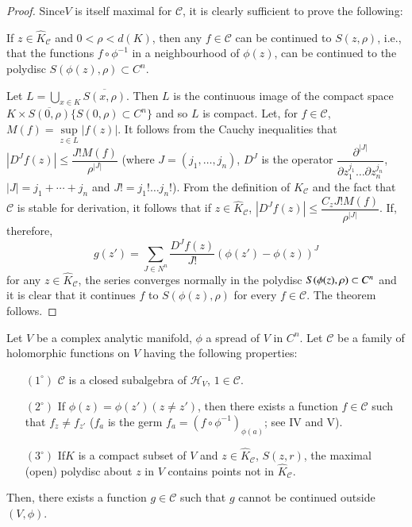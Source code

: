 \begin{proof}
Since\pageoriginale $V$ is itself maximal for $\mathscr{C}$, it is
clearly sufficient to prove the following:

If $z \in \hat{K}_{\mathscr{C}}$ and $0< \rho < d(K)$, then any $f
\in\mathscr{C}$ can be continued to $S (z, \rho)$, i.e., that the
functions $f \circ \phi^{-1}$ in a neighbourhood of $\phi(z)$, can be
continued to the polydisc $S(\phi(z), \rho) \subset C^n$. 

Let $L = \bigcup\limits_{x \in K} \overline{S(x,\rho)}$. Then $L$ is
the continuous image of the compact space $K \times
\overline{S(0,\rho) } \{S(0,\rho) \subset C^n\}$ and so $L$ is
compact. Let, for $f \in \mathscr{C}$, $M(f) = \sup\limits_{z \in L}
|f(z)|$. It follows from the Cauchy inequalities that $|D^J f(z)| \leq
\dfrac{J!M(f)}{\rho^{|J|}}$ (where $J = (j_1, \ldots, j_n)$, $D^J$ is the
operator $\dfrac{\partial^{|J|}}{\partial z^{j_1}_{1} \ldots \partial
  z^{j_n}_n}$, $|J| = j_1 + \cdots + j_n$ and $J! = j_1 !\ldots j_n
!$). From the definition of $\hat{K}_{\mathscr{C}}$ and the fact that
$\mathscr{C}$  is stable for derivation, it follows that if $z
\in\hat{K}_{\mathscr{C}}$, $|D^J f(z)| \leq \dfrac{C_z
  J!M(f)}{\rho^{|J|}}$. If, therefore, 
$$
g(z') = \sum\limits_{J \in N^n} \frac{D^J f(z)}{J!} (\phi (z') - \phi (z))^J
$$
for any $z \in \hat{K}_{\mathscr{C}}$, the series converges normally
in the polydisc $S (\phi (z),\break \rho) \subset C^n$ and it is clear that
it continues $f$ to $S (\phi(z), \rho)$ for every $f \in
\mathscr{C}$. The theorem follows.
\end{proof}

\begin{thm}\label{chap6:thm2}
Let $V$ be a complex analytic manifold, $\phi$ a spread of $V$ in
$C^n$. Let $\mathscr{C}$ be a family of holomorphic functions on $V$
having the following properties:
\begin{itemize}
\item[$(1^\circ)$] $\mathscr{C}$ is a closed subalgebra of $\mathscr{H}_V$,
$1 \in\mathscr{C}$.

\item[$(2^\circ)$] If $\phi(z) = \phi(z') (z \neq z')$, then there
  exists a function $f \in\mathscr{C}$ such that $f_z \neq f_{z'}$
  ($f_a$ is the germ $f_a = (f \circ \phi^{-1})_{\phi(a)}$; see IV and
  V).  

\item[$(3^\circ)$] If\pageoriginale $K$ is a compact subset of $V$ and
  $z \in \hat{K}_{\mathscr{C}}$, $S(z,r)$, the maximal (open)
  polydisc about $z$ in $V$ contains points not in
  $\hat{K}_{\mathscr{C}}$. 
\end{itemize}

Then, there exists a function $g \in \mathscr{C}$ such that $g$ cannot
be continued outside $(V, \phi)$. 
\end{thm}

